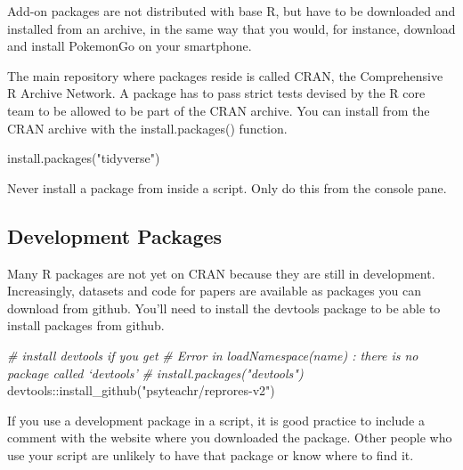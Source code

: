 \documentclass[
  oneside]{book}
\newenvironment{Shaded}{\begin{snugshade}}{\end{snugshade}}
\newcommand{\CommentTok}[1]{\textcolor[rgb]{0.56,0.35,0.01}{\textit{#1}}}
\newcommand{\FunctionTok}[1]{\textcolor[rgb]{0.00,0.00,0.00}{#1}}
\newcommand{\NormalTok}[1]{#1}
\newcommand{\SpecialCharTok}[1]{\textcolor[rgb]{0.00,0.00,0.00}{#1}}
\newcommand{\StringTok}[1]{\textcolor[rgb]{0.31,0.60,0.02}{#1}}
\begin{document}
Add-on packages are not distributed with base R, but have to be downloaded and installed from an archive, in the same way that you would, for instance, download and install PokemonGo on your smartphone.

The main repository where packages reside is called CRAN, the Comprehensive R Archive Network. A package has to pass strict tests devised by the R core team to be allowed to be part of the CRAN archive. You can install from the CRAN archive with the {install.packages}{(}{)} function.

\begin{Shaded}
\begin{Highlighting}[]
\FunctionTok{install.packages}\NormalTok{(}\StringTok{"tidyverse"}\NormalTok{)}
\end{Highlighting}
\end{Shaded}

\begin{dangerous}
Never install a package from inside a script. Only do this from the console pane.

\end{dangerous}

\hypertarget{development-packages}{%
\subsection{Development Packages}\label{development-packages}}

Many R packages are not yet on CRAN because they are still in development. Increasingly, datasets and code for papers are available as packages you can download from github. You'll need to install the devtools package to be able to install packages from github.

\begin{Shaded}
\begin{Highlighting}[]
\CommentTok{\# install devtools if you get}
\CommentTok{\# Error in loadNamespace(name) : there is no package called ‘devtools’}
\CommentTok{\# install.packages("devtools")}
\NormalTok{devtools}\SpecialCharTok{::}\FunctionTok{install\_github}\NormalTok{(}\StringTok{"psyteachr/reprores{-}v2"}\NormalTok{)}
\end{Highlighting}
\end{Shaded}

If you use a development package in a script, it is good practice to include a comment with the website where you downloaded the package. Other people who use your script are unlikely to have that package or know where to find it.
\end{document}

